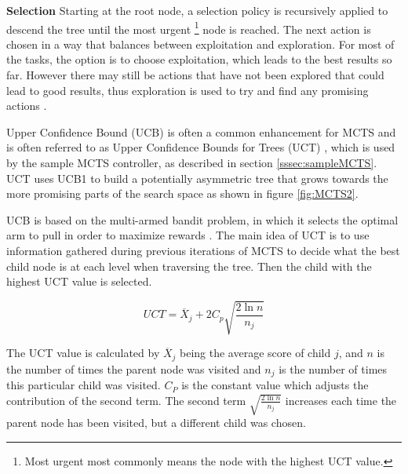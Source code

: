 \documentclass[journal]{IEEEtran}
\begin{document}
		\textbf{Selection}
			Starting at the root node, a selection policy is recursively applied to descend the tree until the most urgent \footnote{Most urgent most commonly means the node with the highest UCT value.} node is reached. 
			The next action is chosen in a way that balances between exploitation and exploration. For most of the tasks, the option is to choose exploitation, which leads to the best results so far. However there may still be actions that have not been explored that could lead to good results, thus exploration is used to try and find any promising actions \cite{chaslot2008monte}.
			
			Upper Confidence Bound (UCB) is often a common enhancement for MCTS and is often referred to as Upper Confidence Bounds for Trees (UCT) \cite{bravi2017evolving}, which is used by the sample MCTS controller, as described in section \ref{sssec:sampleMCTS}. 
			UCT uses UCB1 to build a potentially asymmetric tree that grows towards the more promising parts of the search space as shown in figure \ref{fig:MCTS2}. 

			UCB is based on the multi-armed bandit problem, in which it selects the optimal arm to pull in order to maximize rewards \cite{kocsis2006bandit, browne2012survey, gelly2006modification}.
			The main idea of UCT is to use information gathered during previous iterations of MCTS to decide what the best child node is at each level when traversing the tree. Then the child with the highest UCT value is selected. 
			
			

			\begin{equation} \label{eqUCT}
				 UCT  = \overline{X} _j + 2C _p \sqrt{\frac{ 2 \ln n}{n _j}}
			\end{equation} 
			
			The UCT value is calculated by \( \overline{X} _j\)   being the average score of child \( j \), and \( n \) is the number of times the parent node was visited and \(n _j \) is the number of times this particular child was visited. \( C _P \) is the constant value which adjusts the contribution of the second term. 
			The second term \( \sqrt{\frac{ 2 \ln n}{n _j}} \)  increases each time the parent node has been visited, but a different child was chosen.
			
\end{document}

